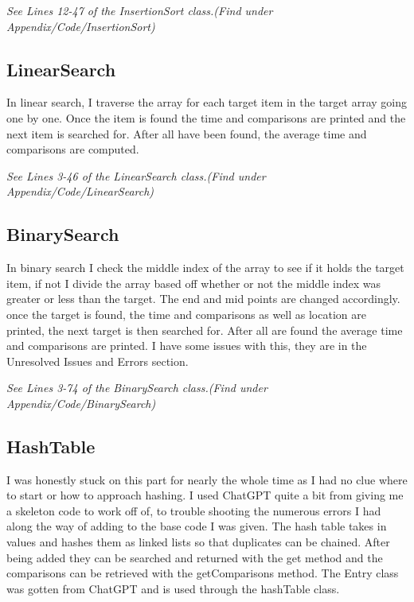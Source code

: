\documentclass[10pt]{article}
\begin{document}
\emph{\normalfont 
See Lines 12-47 of the InsertionSort class.(Find under Appendix/Code/InsertionSort)}

\subsection{LinearSearch}
In linear search, I traverse the array for each target item in the target array going one by one. Once the item is found the time and comparisons are printed and the next item is searched for. After all have been found, the average time and comparisons are computed.


\newline

\emph{\normalfont 
See Lines 3-46 of the LinearSearch class.(Find under Appendix/Code/LinearSearch)}

\subsection{BinarySearch}
In binary search I check the middle index of the array to see if it holds the target item, if not I divide the array based off whether or not the middle index was greater or less than the target. The end and mid points are changed accordingly. once the target is found, the time and comparisons as well as location are printed, the next target is then searched for. After all are found the average time and comparisons are printed. I have some issues with this, they are in the Unresolved Issues and Errors section.


\newline

\emph{\normalfont 
See Lines 3-74 of the BinarySearch class.(Find under Appendix/Code/BinarySearch)}

\subsection{HashTable}
I was honestly stuck on this part for nearly the whole time as I had no clue where to start or how to approach hashing. I used ChatGPT quite a bit from giving me a skeleton code to work off of, to trouble shooting the numerous errors I had along the way of adding to the base code I was given. The hash table takes in values and hashes them as linked lists so that duplicates can be chained. After being added they can be searched and returned with the get method and the comparisons can be retrieved with the getComparisons method. The Entry class was gotten from ChatGPT and is used through the hashTable class.
\end{document}
